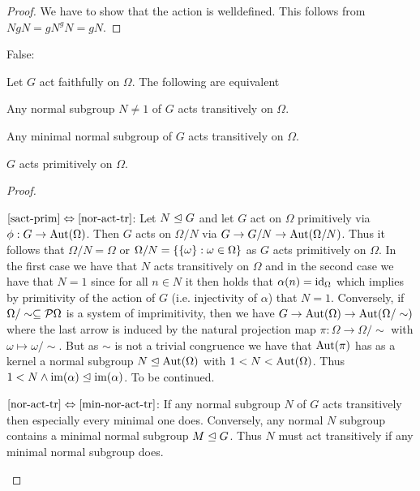 \documentclass[8pt,a4paper]{article}
\begin{document}
\begin{proof}\label{bew}
    We have to show that the action is welldefined. This follows from $NgN=gN^gN=gN$.
\end{proof}

False:
\begin{lemma}
    Let $G$ act faithfully on $\Omega$.
    The following are equivalent
    \begin{statements}
            \item\label{nor-act-tr} Any normal subgroup $N\neq 1$ of $G$ acts transitively on $\Omega$.
            \item\label{min-nor-act-tr} Any minimal normal subgroup of $G$ acts transitively on $\Omega$.
            \item\label{sact-prim} $G$ acts primitively on $\Omega$.
    \end{statements}
\end{lemma}

\begin{proof}
    \begin{implications}
            \item[$\ref{sact-prim}\Leftrightarrow\ref{nor-act-tr}$:]
        Let $N\trianglelefteq G$ and let $G$ act on $\Omega$ primitively via $\phi:G\rightarrow\mathop\mathrm{Aut}\nolimits(\Omega)$. Then $G$ acts on $\Omega/N$ via $G\rightarrow G/N\rightarrow \mathop\mathrm{Aut}\nolimits(\Omega/N)$. Thus it follows that $\Omega/N=\Omega$ or $\Omega/N=\set{\set{\omega}}[\omega\in \Omega]$ as $G$ acts primitively on $\Omega$. In the first case we have that $N$ acts transitively on $\Omega$ and in the second case we have that $N=1$ since for all $n\in N$ it then holds that $\alpha(n)=\mathop\mathrm{id}\nolimits_{\Omega}$ which implies by primitivity of the action of $G$ (i.e. injectivity of $\alpha$) that $N=1$.
        Conversely, if $\Omega/\sim\subseteq \powerset{\Omega}$ is a system of imprimitivity, then we have $G\rightarrow \mathop\mathrm{Aut}\nolimits(\Omega)\rightarrow\mathop\mathrm{Aut}\nolimits(\Omega/\sim)$ where the last arrow is induced by the natural projection map $\pi:\Omega\to\Omega/\sim$ with $\omega\mapsto \omega/\sim$. But as $\sim$ is not a trivial congruence we have that $\mathop\mathrm{Aut}\nolimits(\pi)$ has as a kernel a normal subgroup $N\trianglelefteq \mathop\mathrm{Aut}\nolimits(\Omega)$ with $1< N< \mathop\mathrm{Aut}\nolimits(\Omega)$. Thus $1<N\wedge \mathop\mathrm{im}(\alpha)\trianglelefteq \mathop\mathrm{im}(\alpha)$.
        To be continued.

        
            \item[$\ref{nor-act-tr}\Leftrightarrow\ref{min-nor-act-tr}$:]
        If any normal subgroup $N$ of $G$ acts transitively then especially every minimal one does. Conversely, any normal $N$ subgroup contains a minimal normal subgroup $M\trianglelefteq G$. Thus $N$ must act transitively if any minimal normal subgroup does.
\end{implications}
\end{proof}
\end{document}
